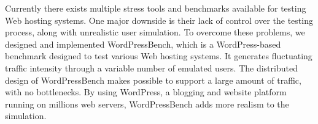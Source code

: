 
Currently there exists multiple stress tools and benchmarks available for testing Web hosting systems. One major downside is their lack of control over the testing process, along with unrealistic user simulation. To overcome these problems, we designed and implemented WordPressBench, which is a WordPress-based benchmark designed to test various Web hosting systems. It generates fluctuating traffic intensity through a variable number of emulated users. The distributed design of WordPressBench makes possible to support a large amount of traffic, with no bottlenecks. By using WordPress, a blogging and website platform running on millions web servers, WordPressBench adds more realism to the simulation.
